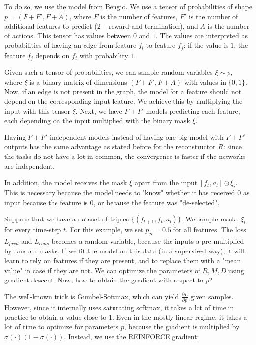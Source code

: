 \documentclass[a4paper,11pt,oneside]{report}
\begin{document}
To do so, we use the model from Bengio. We use a tensor of probabilities of shape $p=(F+F', F+A)$, where $F$ is the number of features, $F'$ is the number of additional features to predict (2 -- reward and termination), and $A$ is the number of actions. This tensor has values between $0$ and $1$. The values are interpreted as probabilities of having an edge from feature $f_i$ to feature $f_j$: if the value is $1$, the feature $f_j$ depends on $f_i$ with probability $1$.

Given such a tensor of probabilities, we can sample random variables $\xi\sim p$, where $\xi$ is a binary matrix of dimensions $(F+F', F+A)$ with values in $\{0, 1\}$. Now, if an edge is not present in the graph, the model for a feature should not depend on the corresponding input feature. We achieve this by multiplying the input with this tensor $\xi$. Next, we have $F+F'$ models predicting each feature, each depending on the input multiplied with the binary mask $\xi$.

Having $F+F'$ independent models instead of having one big model with $F+F'$ outputs has the same advantage as stated before for the reconstructor $R$: since the tasks do not have a lot in common, the convergence is faster if the networks are independent.

In addition, the model receives the mask $\xi$ apart from the input $[f_t, a_t]\odot \xi_i$. This is necessary because the model needs to "know" whether it has received $0$ as input because the feature is $0$, or because the feature was "de-selected".

Suppose that we have a dataset of triples $\{(f_{t+1}, f_t, a_t)\}$. We sample masks $\xi_t$ for every time-step $t$. For this example, we set $p_{ji}=0.5$ for all features. The loss $L_{pred}$ and $L_{cons}$ becomes a random variable, because the inputs a pre-multiplied by random masks. If we fit the model on this data (in a supervised way), it will learn to rely on features if they are present, and to replace them with a "mean value" in case if they are not. We can optimize the parameters of $R, M, D$ using gradient descent. Now, how to obtain the gradient with respect to $p$?

The well-known trick is Gumbel-Softmax, which can yield $\frac{\partial L}{\partial p}$ given samples. However, since it internally uses saturating softmax,  it takes a lot of time in practice to obtain a value close to $1$. Even in the mostly-linear regime, it takes a lot of time to optimize for parameters $p$, because the gradient is multiplied by $\sigma(\cdot)(1-\sigma(\cdot))$. Instead, we use the REINFORCE gradient:
\end{document}
